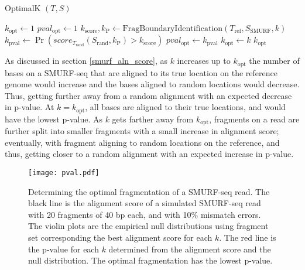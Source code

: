 \begin{algorithm}[H]
\caption{OptimalK $(T,S)$}
\begin{algorithmic}[1]
  \STATE $k_\mathrm{opt} \leftarrow 1$
  \STATE $pval_\mathrm{opt} \leftarrow 1$
    \STATE $k_\mathrm{score}, k_\mathrm{P} \leftarrow
              \text{FragBoundaryIdentification}
              (T_\mathrm{ref},S_\mathrm{SMURF},k)$
    \STATE $k_{\mathrm{pval}} \leftarrow \Pr(score_{T_\mathrm{rand}}
              (S_\mathrm{rand},k_\mathrm{P}) > k_\mathrm{score})$
      \STATE $pval_\mathrm{opt} \leftarrow k_{\mathrm{pval}}$
      \STATE $k_\mathrm{opt} \leftarrow k$
    \ENDIF
  \ENDFOR
  \RETURN $k_\mathrm{opt}$
\end{algorithmic}
\label{p_val_alg}
\end{algorithm}

As discussed in section \ref{smurf_aln_score}, as $k$ increases up to
$k_\mathrm{opt}$ the number of bases on a SMURF-seq that are aligned to
its true location on the reference genome would increase and the bases
aligned to random locations would decrease. Thus, getting further away
from a random alignment with an expected decrease in p-value. At $k =
k_\mathrm{opt}$, all bases are aligned to their true locations, and
would have the lowest p-value. As $k$ gets farther away from
$k_\mathrm{opt}$, fragments on a read are further split into smaller
fragments with a small increase in alignment score; eventually, with
fragment aligning to random locations on the reference, and thus,
getting closer to a random alignment with an expected increase in
p-value.

\begin{figure}[t!]
\centering
\texttt{[image: pval.pdf]}
\caption[Determining the optimal fragmentation of a SMURF-seq read]{
  Determining the optimal fragmentation of a SMURF-seq read. The black
  line is the alignment score of a simulated SMURF-seq read with 20
  fragments of 40 bp each, and with 10\% mismatch errors. The violin plots
  are the empirical null distributions using fragment set corresponding
  the best alignment score for each $k$. The red line is the p-value for
  each $k$ determined from the alignment score and the null distribution.
  The optimal fragmentation has the lowest p-value.}
\label{pval_calc}
\end{figure}

